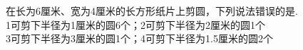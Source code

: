 在长为6厘米、宽为4厘米的长方形纸片上剪圆，下列说法错误的是\key{\qquad}.\\

\textcircled{\small{1}}可剪下半径为1厘米的圆6个；\qquad\textcircled{\small{2}}可剪下半径为2厘米的圆1个\\

\textcircled{\small{3}}可剪下半径为3厘米的圆1个；\qquad\textcircled{\small{4}}可剪下半径为1.5厘米的圆2个



